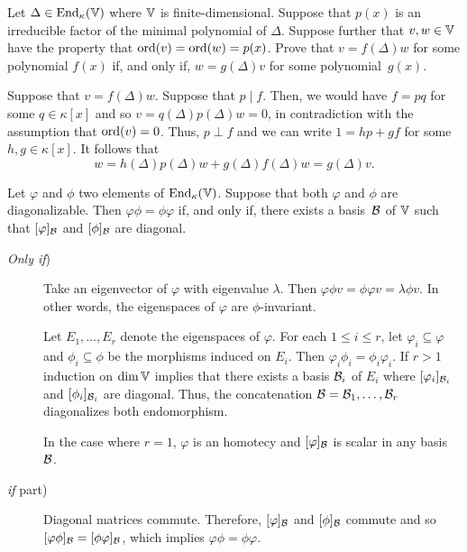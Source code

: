 \begin{exr}
    Let\/ $\Delta\in{\operatorname{End}}_\kappa(\mathbb V)$ where\/ $\mathbb V$ is finite-dimensional. Suppose that\/ $p(x)$ is an irreducible factor of the minimal polynomial of\/ $\Delta$. Suppose further that\/ $v,w\in\mathbb V$ have the property that\/ $\operatorname{ord}(v) = \operatorname{ord}(w) = p(x)$. Prove that\/ $v = f(\Delta)w$ for some polynomial\/ $f(x)$ if, and only if, $w = g(\Delta)v$ for some polynomial\/~$g(x)$.
\end{exr}

\begin{solution}
    Suppose that $v=f(\Delta)w$. Suppose that $p\mid f$. Then, we would have $f=pq$ for some $q\in\kappa[x]$ and so $v=q(\Delta)p(\Delta)w=0$, in contradiction with the assumption that $\operatorname{ord}(v)=0$. Thus, $p\perp f$ and we can write $1=hp+gf$ for some $h,g\in\kappa[x]$. It follows that 
    $$
        w=h(\Delta)p(\Delta)w+g(\Delta)f(\Delta)w = g(\Delta)v.
    $$
\end{solution}

\begin{exr}
    Let\/ $\varphi$ and\/ $\phi$ two elements of ${\operatorname{End}}_\kappa(\mathbb V)$. Suppose that both\/ $\varphi$ and\/ $\phi$ are diagonalizable. Then\/ $\varphi\phi=\phi\varphi$ if, and only if, there exists a basis\/~$\mathcal B$ of\/ $\mathbb V$ such that\/ $[\varphi]_{\mathcal B}$ and\/ $[\phi]_{\mathcal B}$ are diagonal.
\end{exr}

\begin{solution}
    \begin{description}
        \item[\rm\textit{Only if\/})] Take an eigenvector of $\varphi$ with eigenvalue $\lambda$. Then $\varphi\phi v=\phi\varphi v=\lambda\phi v$. In other words, the eigenspaces of $\varphi$ are $\phi$-invariant. 
        
        Let $E_1,\dots,E_r$ denote the eigenspaces of $\varphi$. For each $1\le i\le r$, let $\varphi_i\subseteq\varphi$ and $\phi_i\subseteq\phi$ be the morphisms induced on $E_i$. Then $\varphi_i\phi_i=\phi_i\varphi_i$. If $r>1$ induction on $\dim\mathbb V$ implies that there exists a basis $\mathcal B_i$ of $E_i$ where $[\varphi_i]_{\mathcal B_i}$ and $[\phi_i]_{\mathcal B_i}$ are diagonal. Thus, the concatenation $\mathcal B=\mathcal B_1,\dots,\mathcal B_r$ diagonalizes both endomorphism.

        In the case where $r=1$, $\varphi$ is an homotecy and $[\varphi]_{\mathcal B}$ is scalar in any basis~$\mathcal B$.

        \item[\rm\textit{if\/} part)] Diagonal matrices commute. Therefore, $[\varphi]_{\mathcal B}$ and $[\phi]_{\mathcal B}$ commute and so $[\varphi\phi]_{\mathcal B}=[\phi\varphi]_{\mathcal B}$, which implies $\varphi\phi=\phi\varphi$.
    \end{description}
\end{solution}